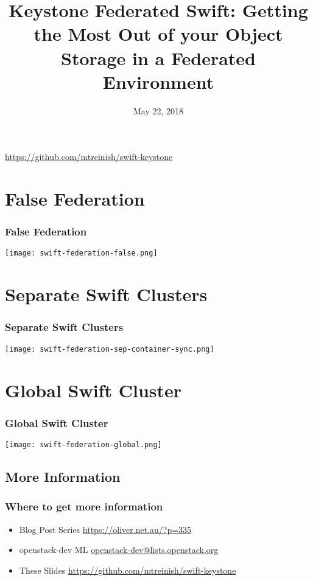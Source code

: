 \documentclass[aspectratio=169,11pt,hyperref={colorlinks=true}]{beamer}
\author[Matthew Treinish & Matthew Oliver]{%
    \texorpdfstring{%
        \begin{columns}
            \column{.45\linewidth}
            \centering
            Matthew Treinish\\
            Developer Advocate - IBM\\
            \href{mailto:mtreinish@kortar.org}{mtreinish@kortar.org}\\
        \texttt{mtreinish on Freenode}
        \column{.45\linewidth}
            \centering
            Matthew Oliver\\
            \href{mailto:matt@oliver.net.au}{matt@oliver.net.au}\\
            \texttt{mattoliverau on Freenode}
        \end{columns}
        }
    {Matthew Treinish & Matthew Oliver}
}
\date{May 22, 2018}
\title[Keystone Federated Swift: Getting the Most Out of your Object Storage in a Federated Environment
\hspace{2em}\insertframenumber/\inserttotalframenumber]{Keystone Federated Swift: Getting the Most Out of your Object Storage in a Federated Environment}
\begin{document}
{%
\begin{frame}[noframenumbering]
    \hypersetup{colorlinks,urlcolor=white}
    \titlepage{}
    \centering
    \href{https://github.com/mtreinish/swift-keystone}{https://github.com/mtreinish/swift-keystone}
\end{frame}
}

\section{False Federation}
\begin{frame}
\frametitle{False Federation}
\centering
\texttt{[image: swift-federation-false.png]}
\end{frame}

\section{Separate Swift Clusters}
\begin{frame}
\frametitle{Separate Swift Clusters}
\centering
\texttt{[image: swift-federation-sep-container-sync.png]}
\end{frame}

\section{Global Swift Cluster}
\begin{frame}
\frametitle{Global Swift Cluster}
\centering
\texttt{[image: swift-federation-global.png]}
\end{frame}

\subsection{More Information}
\begin{frame}
\frametitle{Where to get more information}
    \begin{itemize}
        \item Blog Post Series\: \href{https://oliver.net.au/?p=335}{https://oliver.net.au/?p=335}
        \item openstack-dev ML\: \href{mailto:openstack-dev@lists.openstack.org}{openstack-dev@lists.openstack.org}
        \item These Slides\: \href{https://github.com/mtreinish/swift-keystone}{https://github.com/mtreinish/swift-keystone}
   \end{itemize}
\end{frame}
\end{document}
